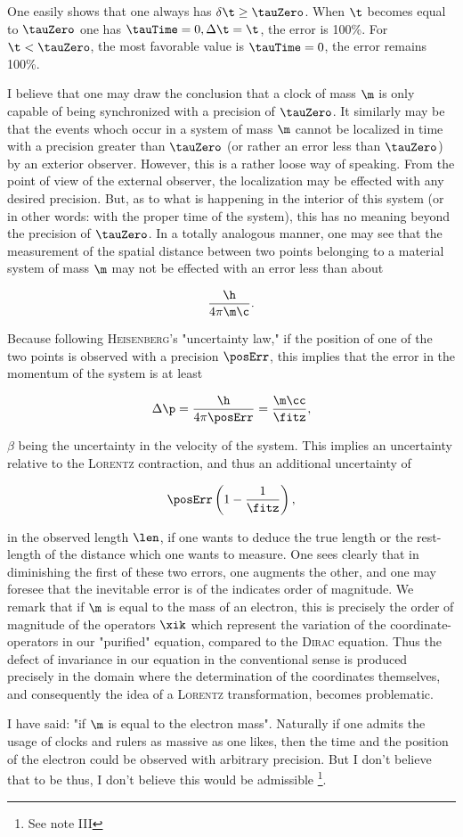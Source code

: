 \documentclass{article}
\newcommand{\uequ}[1]{
\begin{equation*}
#1
\end{equation*}
}
\renewcommand{\sc}[1]{\textsc{#1}}
\newcommand{\ifitz}[1]{\frac{#1}{\fitz}}
\begin{document}
One easily shows that one always has $\delta\t \geq \tauZero$. When $\t$ becomes equal to $\tauZero$ one has $\tauTime = 0, \Delta\t = \t$, the error is 100\%. For $\t < \tauZero$, the most favorable value is $\tauTime = 0$, the error remains 100\%.

I believe that one may draw the conclusion that a clock of mass $\m$ is only capable of being synchronized with a precision of $\tauZero$. It similarly may be that the events whoch occur in a system of mass $\m$ cannot be localized in time with a precision greater than $\tauZero$ (or rather an error less than $\tauZero$) by an exterior observer. However, this is a rather loose way of speaking. From the point of view of the external observer, the localization may be effected with any desired precision. But, as to what is happening in the interior of this system (or in other words: with the proper time of the system), this has no meaning beyond the precision of $\tauZero$. In a totally analogous manner, one may see that the measurement of the spatial distance between two points belonging to a material system of mass $\m$ may not be effected with an error less than about
\uequ{
\frac{\h}{4\pi\m\c}.
}
Because following \sc{Heisenberg}'s "uncertainty law," if the position of one of the two points is observed with a precision $\posErr$, this implies that the error in the momentum of the system is at least
\uequ{
\Delta\p = \frac{\h}{4\pi\posErr} = \ifitz{\m\cc},
}
$\beta$ being the uncertainty in the velocity of the system. This implies an uncertainty relative to the \sc{Lorentz} contraction, and thus an additional uncertainty of
\uequ{
\posErr\left(1-\ifitz{1}\right),
}
in the observed length $\len$, if one wants to deduce the true length or the rest-length of the distance which one wants to measure. One sees clearly that in diminishing the first of these two errors, one augments the other, and one may foresee that the inevitable error is of the indicates order of magnitude. We remark that if $\m$ is equal to the mass of an electron, this is precisely the order of magnitude of the operators $\xik$ which represent the variation of the coordinate-operators in our "purified" equation, compared to the \sc{Dirac} equation. Thus the defect of invariance in our equation in the conventional sense is produced precisely in the domain where the determination of the coordinates themselves, and consequently the idea of a \sc{Lorentz} transformation, becomes problematic.

I have said: "if $\m$ is equal to the electron mass". Naturally if one admits the usage of clocks and rulers as massive as one likes, then the time and the position of the electron could be observed with arbitrary precision. But I don't believe that to be thus, I don't believe this would be admissible \footnote{See note III}.
\end{document}
